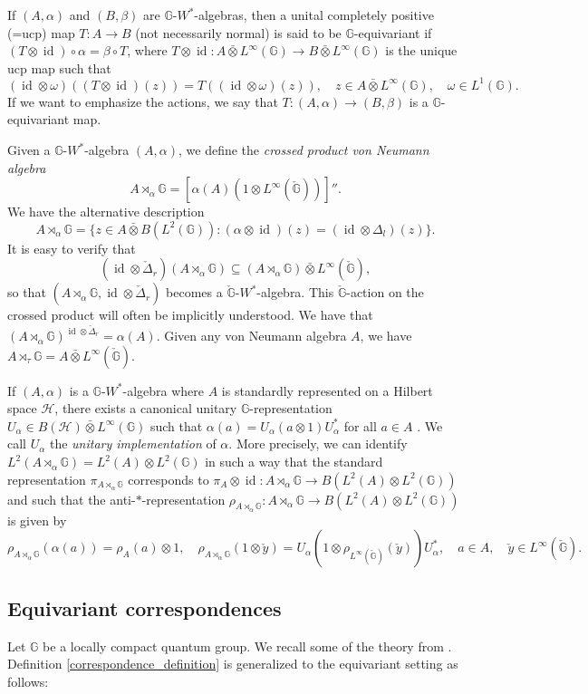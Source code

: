 \documentclass[reqno]{amsart}
\numberwithin{equation}{section}
\DeclareMathOperator{\id}{\mathrm{id}}
\newcommand{\G}{\mathbb{G}}
\newcommand{\ovot}{\bar{\otimes}}
\begin{document}
If $(A, \alpha)$ and $(B, \beta)$ are $\G$-$W^*$-algebras, then a unital completely positive (=ucp) map $T: A \to B$ (not necessarily normal) is said to be $\G$-equivariant if $(T \otimes \id)\circ \alpha = \beta \circ T$, where $T\otimes \id: A \ovot L^\infty(\G)\to B \ovot L^\infty(\G)$ is the unique ucp map such that
$$(\id \otimes \omega)((T\otimes \id)(z)) = T((\id \otimes \omega)(z)), \quad z \in A \ovot L^\infty(\G), \quad \omega \in L^1(\G).$$
If we want to emphasize the actions, we say that $T: (A, \alpha)\to (B, \beta)$ is a $\G$-equivariant map.

Given a $\G$-$W^*$-algebra $(A, \alpha)$,  we define the \emph{crossed product von Neumann algebra}
$$A\rtimes_\alpha \G= [\alpha(A)(1\otimes L^\infty(\check{\G}))]''.$$
We have the alternative description
$$A\rtimes_\alpha \G = \{z \in A \ovot B(L^2(\G)): (\alpha\otimes \id)(z) =(\id \otimes \Delta_l)(z)\}.$$
It is easy to verify that 
$$(\id \otimes \check{\Delta}_r)(A\rtimes_\alpha \G)\subseteq (A\rtimes_\alpha \G)\ovot L^\infty(\check{\G}),$$
so that $(A\rtimes_\alpha \G, \id \otimes \check{\Delta}_r)$ becomes a $\check{\G}$-$W^*$-algebra. This $\check{\G}$-action on the crossed product will often be implicitly understood. We have that $(A\rtimes_\alpha \G)^{\id \otimes \check{\Delta}_r}= \alpha(A)$. Given any von Neumann algebra $A$, we have $A\rtimes_\tau \G = A\ovot L^\infty(\check{\G})$.

If $(A, \alpha)$ is a $\G$-$W^*$-algebra where $A$ is standardly represented on a Hilbert space $\mathcal{H}$, there exists a canonical unitary $\G$-representation $U_\alpha \in B(\mathcal{H})\ovot L^\infty(\G)$ such that $\alpha(a)= U_\alpha(a\otimes 1)U_\alpha^*$ for all $a\in A$ \cite{Va01}. We call $U_\alpha$ the \emph{unitary implementation} of $\alpha$. More precisely, we can identify $L^2(A\rtimes_\alpha \G)= L^2(A)\otimes L^2(\G)$ in such a way that the standard representation $\pi_{A\rtimes_\alpha \G}$ corresponds to $\pi_A\otimes \id: A\rtimes_\alpha \G \to B(L^2(A)\otimes L^2(\G))$ and such that the anti-$*$-representation $\rho_{A\rtimes_\alpha \G}: A\rtimes_\alpha \G \to B(L^2(A)\otimes L^2(\G))$ is given by
$$\rho_{A\rtimes_\alpha \G}(\alpha(a)) = \rho_A(a)\otimes 1, \quad \rho_{A\rtimes_\alpha \G}(1\otimes \check{y})=U_\alpha(1\otimes \rho_{L^\infty(\check{\G})}(\check{y}))U_\alpha^*, \quad a\in A, \quad \check{y}\in L^\infty(\check{\G}).$$

\subsection{Equivariant correspondences} Let $\G$ be a locally compact quantum group. We recall some of the theory from \cite{DCDR24a}. Definition \ref{correspondence_definition} is generalized to the equivariant setting as follows:
\end{document}
